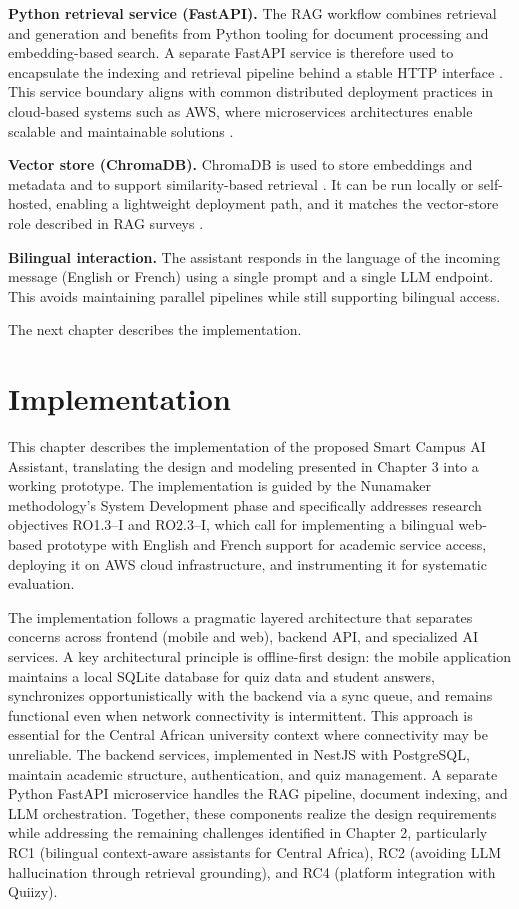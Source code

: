 \documentclass[a4paper,9pt,twocolumn]{extarticle}
\begin{document}
\textbf{Python retrieval service (FastAPI).} The RAG workflow combines
retrieval and generation \cite{lewis2020retrieval,gao2023retrieval} and
benefits from Python tooling for document processing and embedding-based
search. A separate FastAPI service is therefore used to encapsulate the
indexing and retrieval pipeline behind a stable HTTP interface
\cite{fastapiDocs}. This service boundary aligns with common distributed
deployment practices in cloud-based systems such as AWS, where microservices
architectures enable scalable and maintainable solutions
\cite{shukur2020cloud,rashid2018distributed}.

\textbf{Vector store (ChromaDB).} ChromaDB is used to store embeddings and
metadata and to support similarity-based retrieval \cite{chromaDocs}. It
can be run locally or self-hosted, enabling a lightweight deployment
path, and it matches the vector-store role described in RAG surveys
\cite{gao2023retrieval}.

\textbf{Bilingual interaction.} The assistant responds in the language of
the incoming message (English or French) using a single prompt and a
single LLM endpoint. This avoids maintaining parallel pipelines while
still supporting bilingual access.

The next chapter describes the implementation.

\section{Implementation}
\label{sec:implementation}

This chapter describes the implementation of the proposed Smart Campus AI Assistant, translating the design and modeling presented in Chapter 3 into a working prototype. The implementation is guided by the Nunamaker methodology's System Development phase and specifically addresses research objectives RO1.3--I and RO2.3--I, which call for implementing a bilingual web-based prototype with English and French support for academic service access, deploying it on AWS cloud infrastructure, and instrumenting it for systematic evaluation.

The implementation follows a pragmatic layered architecture that separates concerns across frontend (mobile and web), backend API, and specialized AI services. A key architectural principle is offline-first design: the mobile application maintains a local SQLite database for quiz data and student answers, synchronizes opportunistically with the backend via a sync queue, and remains functional even when network connectivity is intermittent. This approach is essential for the Central African university context where connectivity may be unreliable. The backend services, implemented in NestJS with PostgreSQL, maintain academic structure, authentication, and quiz management. A separate Python FastAPI microservice handles the RAG pipeline, document indexing, and LLM orchestration. Together, these components realize the design requirements while addressing the remaining challenges identified in Chapter 2, particularly RC1 (bilingual context-aware assistants for Central Africa), RC2 (avoiding LLM hallucination through retrieval grounding), and RC4 (platform integration with Quiizy).
\end{document}
